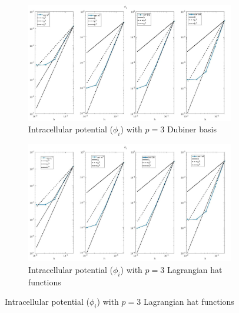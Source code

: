\documentclass[a4paper,11pt]{article}
\begin{document}
\begin{figure}[H]
\caption{Comparison of the intracellular potential ($\phi_i$)}
\label{phii_3}
\begin{subfigure}{\textwidth}
\begin{center}
\includegraphics[width = \textwidth]{./errors/D3_Phii_1.jpg}
\caption{Intracellular potential ($\phi_i$) with $p=3$ Dubiner basis}
\end{center}
\end{subfigure}
\begin{subfigure}{\textwidth}
\begin{center}
\includegraphics[width =\textwidth]{./errors/P3_Phii_1.jpg}
\caption{Intracellular potential ($\phi_i$) with $p=3$ Lagrangian hat functions}
\end{center}
\end{subfigure}
\end{figure}
\end{document}
